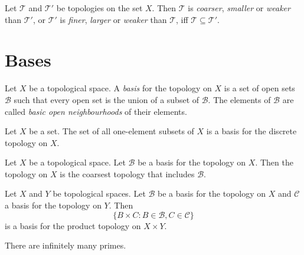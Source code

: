 \begin{df}
Let $\mathcal{T}$ and $\mathcal{T}'$ be topologies on the set $X$. Then $\mathcal{T}$ is \emph{coarser}, \emph{smaller} or \emph{weaker} than $\mathcal{T}'$, or $\mathcal{T}'$ is \emph{finer}, \emph{larger} or \emph{weaker} than $\mathcal{T}$, iff $\mathcal{T} \subseteq \mathcal{T}'$.
\end{df}

\section{Bases}

\begin{df}[Basis]
Let $X$ be a topological space. A \emph{basis} for the topology on $X$ is a set of open sets $\mathcal{B}$ such that every open set is the union of a subset of $\mathcal{B}$. The elements of $\mathcal{B}$ are called \emph{basic open neighbourhoods} of their elements.
\end{df}

\begin{prop}
Let $X$ be a set. The set of all one-element subsets of $X$ is a basis for the discrete topology on $X$.
\end{prop}

\begin{prop}
Let $X$ be a topological space.
Let $\mathcal{B}$ be a basis for the topology on $X$.
Then the topology on $X$ is the coarsest topology that includes $\mathcal{B}$.
\end{prop}

\begin{prop}
Let $X$ and $Y$ be topological spaces. Let $\mathcal{B}$ be a basis for the topology on $X$ and $\mathcal{C}$ a basis for the topology on $Y$. Then
\[ \{ B \times C : B \in \mathcal{B}, C \in \mathcal{C} \} \]
is a basis for the product topology on $X \times Y$.
\end{prop}

\begin{thm}
There are infinitely many primes.
\end{thm}

